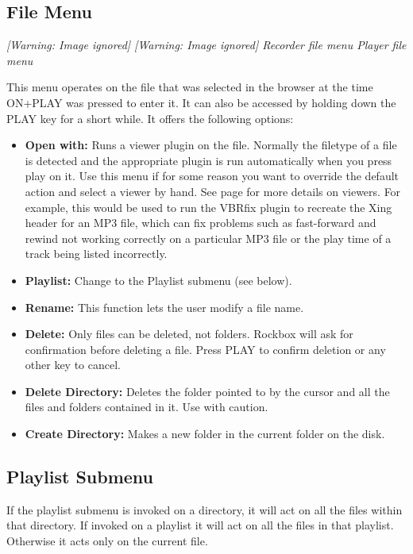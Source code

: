 \subsection{\label{ref:Filemenu}\label{ref:PartIISectionFM}File Menu}
{\centering\itshape
  [Warning: Image ignored] %
     [Warning: Image ignored] %
 \newline
Recorder file menu  Player file menu  
\par}

This menu operates on the file that was selected in the browser at the
time ON+PLAY was pressed to enter it.  It can also be accessed by
holding down the PLAY key for a short while.  It offers the following
options:

\begin{itemize}
\item \textbf{Open with:} Runs a viewer plugin on the file. 
Normally the filetype of a file is detected and the appropriate plugin
is run automatically when you press play on it.  Use this menu if for
some reason you want to override the default action and select a viewer
by hand.  See page \textmd{\pageref{ref:Viewersplugins}} for more details on viewers.
For example, this would be used to run the VBRfix plugin to recreate the
Xing header for an MP3 file, which can fix problems such as
fast{}-forward and rewind not working correctly on a particular MP3 file or the play time of a track being listed incorrectly. 
\item \textbf{Playlist:} Change to the Playlist submenu (see below).
\item \textbf{Rename:} This function lets the user modify a file name.
\item \textbf{Delete:} Only files can be deleted, not folders. Rockbox will ask for confirmation before deleting a file. Press PLAY to confirm deletion or any other key to cancel.
\item \textbf{Delete Directory: }Deletes the folder pointed to by the cursor and all the files and folders contained in it.  Use with caution.
\item \textbf{Create Directory:} Makes a new folder in the current folder on
the disk.
\end{itemize}


\subsection{\label{ref:Playlistsubmenu}Playlist Submenu}
If the playlist submenu is invoked on a directory, it will act on all the files within that directory.  If invoked on a playlist it will act on all the files in that playlist. Otherwise it acts only on the current file.

